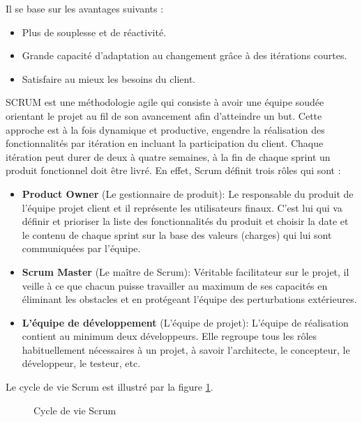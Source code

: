 Il se base sur les avantages suivants :

\begin{itemize}
  \item Plus de souplesse et de réactivité.
  \item Grande capacité d'adaptation au changement grâce à des itérations courtes.
  \item Satisfaire au mieux les besoins du client.
\end{itemize}



SCRUM est une méthodologie agile qui consiste à avoir une équipe soudée orientant le projet au fil de son avancement afin d'atteindre un but. Cette approche est à la fois dynamique et productive, engendre la réalisation des fonctionnalités par itération en incluant la participation du client. Chaque itération peut durer de deux à quatre semaines, à la fin de chaque sprint un produit fonctionnel doit être livré. En effet, Scrum définit trois rôles qui sont :

\begin{itemize}
  \item \textbf{Product Owner }(Le gestionnaire de produit):
  Le responsable du produit de l'équipe projet client et il représente les utilisateurs finaux. C'est lui qui va définir et prioriser la liste des fonctionnalités du produit et choisir la date et le contenu de chaque sprint sur la base des valeurs (charges) qui lui sont communiquées par l'équipe.
  \item \textbf{Scrum Master} (Le maître de Scrum):
  Véritable facilitateur sur le projet, il veille à ce que chacun puisse travailler au maximum de ses capacités en éliminant les obstacles et en protégeant l'équipe des perturbations extérieures.
  \item \textbf{L'équipe de développement} (L'équipe de projet):
  L'équipe de réalisation contient au minimum deux développeurs. Elle regroupe tous les rôles habituellement nécessaires à un projet, à savoir l'architecte, le concepteur, le développeur, le testeur, etc.
\end{itemize}

Le cycle de vie Scrum est illustré par la figure \ref{fig:cycle_de_vie_scrum}.

\begin{figure}[!h]
  \centering
  \caption{Cycle de vie Scrum}
  \label{fig:cycle_de_vie_scrum}
\end{figure}

